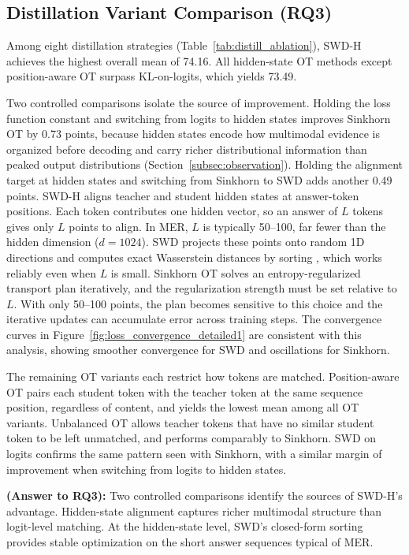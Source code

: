 \documentclass[sigconf]{acmart}
\begin{document}
\subsection{Distillation Variant Comparison (RQ3)}

Among eight distillation strategies (Table~\ref{tab:distill_ablation}), SWD-H achieves the highest overall mean of 74.16. All hidden-state OT methods except position-aware OT surpass KL-on-logits, which yields 73.49.

Two controlled comparisons isolate the source of improvement. Holding the loss function constant and switching from logits to hidden states improves Sinkhorn OT by 0.73 points, because hidden states encode how multimodal evidence is organized before decoding and carry richer distributional information than peaked output distributions (Section~\ref{subsec:observation}). Holding the alignment target at hidden states and switching from Sinkhorn to SWD adds another 0.49 points. SWD-H aligns teacher and student hidden states at answer-token positions. Each token contributes one hidden vector, so an answer of $L$ tokens gives only $L$ points to align. In MER, $L$ is typically 50--100, far fewer than the hidden dimension ($d=1024$). SWD projects these points onto random 1D directions and computes exact Wasserstein distances by sorting \cite{kolouri2019}, which works reliably even when $L$ is small. Sinkhorn OT \cite{NIPS2013_af21d0c9} solves an entropy-regularized transport plan iteratively, and the regularization strength must be set relative to $L$. With only 50--100 points, the plan becomes sensitive to this choice and the iterative updates can accumulate error across training steps. The convergence curves in Figure~\ref{fig:loss_convergence_detailed1} are consistent with this analysis, showing smoother convergence for SWD and oscillations for Sinkhorn.

The remaining OT variants each restrict how tokens are matched. Position-aware OT pairs each student token with the teacher token at the same sequence position, regardless of content, and yields the lowest mean among all OT variants. Unbalanced OT allows teacher tokens that have no similar student token to be left unmatched, and performs comparably to Sinkhorn. SWD on logits confirms the same pattern seen with Sinkhorn, with a similar margin of improvement when switching from logits to hidden states.

\textbf{(Answer to RQ3):} Two controlled comparisons identify the sources of SWD-H's advantage. Hidden-state alignment captures richer multimodal structure than logit-level matching. At the hidden-state level, SWD's closed-form sorting provides stable optimization on the short answer sequences typical of MER.
\end{document}
